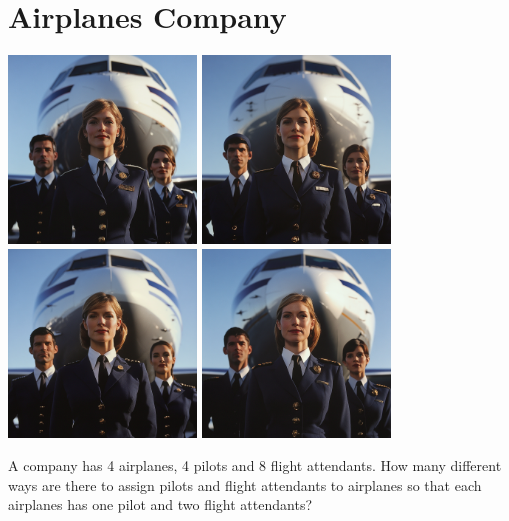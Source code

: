 \documentclass[]{article}
\begin{document}
	\section{Airplanes Company}
	\begin{center}
		\includegraphics[width=5cm]{pilot_and_two_stewards_in_front_of_a_plane0.png}
		\includegraphics[width=5cm]{pilot_and_two_stewards_in_front_of_a_plane1.png}\\
		\vspace{0.8mm}
		\includegraphics[width=5cm]{pilot_and_two_stewards_in_front_of_a_plane2.png}
		\includegraphics[width=5cm]{pilot_and_two_stewards_in_front_of_a_plane3.png}
	\end{center}
	A company has 4 airplanes, 4 pilots and 8 flight attendants.
	How many different ways are there to assign pilots and flight attendants to airplanes so that each airplanes has one pilot and two flight attendants?
	
\end{document}

